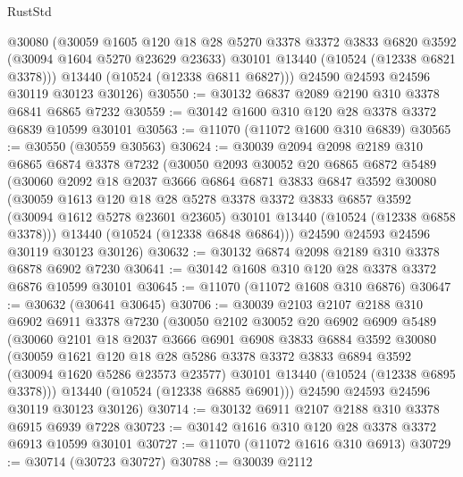 \begin{lexlean}{RustStd}
\begin{coremodule}
        @30080
        (@30059
          @1605
          @120
          @18
          @28
          @5270
          @3378
          @3372
          @3833
          @6820
          @3592
          (@30094 @1604 @5270 @23629 @23633)
          @30101
          @13440
          (@10524 (@12338 @6821 @3378)))
        @13440
        (@10524 (@12338 @6811 @6827)))
      @24590
      @24593
      @24596
      @30119
      @30123
      @30126)
@30550 := @30132 @6837 @2089 @2190 @310 @3378 @6841 @6865 @7232
@30559 := @30142 @1600 @310 @120 @28 @3378 @3372 @6839 @10599 @30101
@30563 := @11070 (@11072 @1600 @310 @6839)
@30565 := @30550 (@30559 @30563)
@30624 := @30039
    @2094
    @2098
    @2189
    @310
    @6865
    @6874
    @3378
    @7232
    (@30050
      @2093
      @30052
      @20
      @6865
      @6872
      @5489
      (@30060
        @2092
        @18
        @2037
        @3666
        @6864
        @6871
        @3833
        @6847
        @3592
        @30080
        (@30059
          @1613
          @120
          @18
          @28
          @5278
          @3378
          @3372
          @3833
          @6857
          @3592
          (@30094 @1612 @5278 @23601 @23605)
          @30101
          @13440
          (@10524 (@12338 @6858 @3378)))
        @13440
        (@10524 (@12338 @6848 @6864)))
      @24590
      @24593
      @24596
      @30119
      @30123
      @30126)
@30632 := @30132 @6874 @2098 @2189 @310 @3378 @6878 @6902 @7230
@30641 := @30142 @1608 @310 @120 @28 @3378 @3372 @6876 @10599 @30101
@30645 := @11070 (@11072 @1608 @310 @6876)
@30647 := @30632 (@30641 @30645)
@30706 := @30039
    @2103
    @2107
    @2188
    @310
    @6902
    @6911
    @3378
    @7230
    (@30050
      @2102
      @30052
      @20
      @6902
      @6909
      @5489
      (@30060
        @2101
        @18
        @2037
        @3666
        @6901
        @6908
        @3833
        @6884
        @3592
        @30080
        (@30059
          @1621
          @120
          @18
          @28
          @5286
          @3378
          @3372
          @3833
          @6894
          @3592
          (@30094 @1620 @5286 @23573 @23577)
          @30101
          @13440
          (@10524 (@12338 @6895 @3378)))
        @13440
        (@10524 (@12338 @6885 @6901)))
      @24590
      @24593
      @24596
      @30119
      @30123
      @30126)
@30714 := @30132 @6911 @2107 @2188 @310 @3378 @6915 @6939 @7228
@30723 := @30142 @1616 @310 @120 @28 @3378 @3372 @6913 @10599 @30101
@30727 := @11070 (@11072 @1616 @310 @6913)
@30729 := @30714 (@30723 @30727)
@30788 := @30039
    @2112

\end{coremodule}
\end{lexlean}
